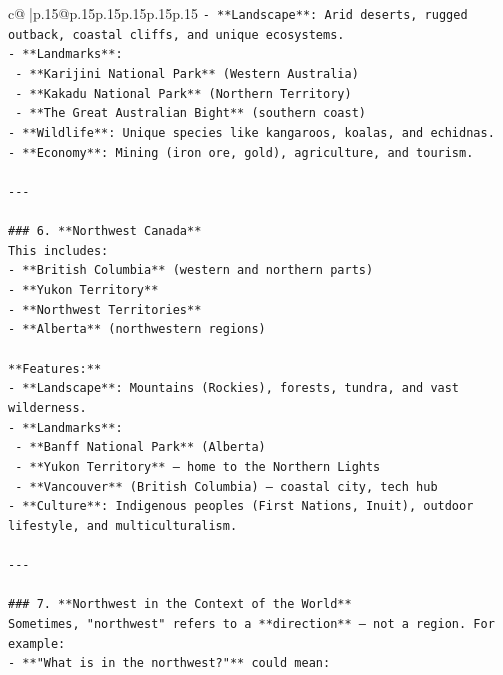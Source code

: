 \documentclass{article}
\begin{document}
{\begin{supertabular}{c@{$\;$}|p{.15\linewidth}@{}p{.15\linewidth}p{.15\linewidth}p{.15\linewidth}p{.15\linewidth}p{.15\linewidth}}
{{{\texttt{{-} **Landscape**: Arid deserts, rugged outback, coastal cliffs, and unique ecosystems.} \\
\texttt{{-} **Landmarks**:} \\
\texttt{  {-} **Karijini National Park** (Western Australia)} \\
\texttt{  {-} **Kakadu National Park** (Northern Territory)} \\
\texttt{  {-} **The Great Australian Bight** (southern coast)} \\
\texttt{{-} **Wildlife**: Unique species like kangaroos, koalas, and echidnas.} \\
\texttt{{-} **Economy**: Mining (iron ore, gold), agriculture, and tourism.} \\
\\ 
\texttt{{-}{-}{-}} \\
\\ 
\texttt{\#\#\# 6. **Northwest Canada**} \\
\texttt{This includes:} \\
\texttt{{-} **British Columbia** (western and northern parts)} \\
\texttt{{-} **Yukon Territory**} \\
\texttt{{-} **Northwest Territories**} \\
\texttt{{-} **Alberta** (northwestern regions)} \\
\\ 
\texttt{**Features:**} \\
\texttt{{-} **Landscape**: Mountains (Rockies), forests, tundra, and vast wilderness.} \\
\texttt{{-} **Landmarks**:} \\
\texttt{  {-} **Banff National Park** (Alberta)} \\
\texttt{  {-} **Yukon Territory** — home to the Northern Lights} \\
\texttt{  {-} **Vancouver** (British Columbia) — coastal city, tech hub} \\
\texttt{{-} **Culture**: Indigenous peoples (First Nations, Inuit), outdoor lifestyle, and multiculturalism.} \\
\\ 
\texttt{{-}{-}{-}} \\
\\ 
\texttt{\#\#\# 7. **Northwest in the Context of the World**} \\
\texttt{Sometimes, "northwest" refers to a **direction** — not a region. For example:} \\
\texttt{{-} **"What is in the northwest?"** could mean:  } \\
}}}
\end{supertabular}}
\end{document}
